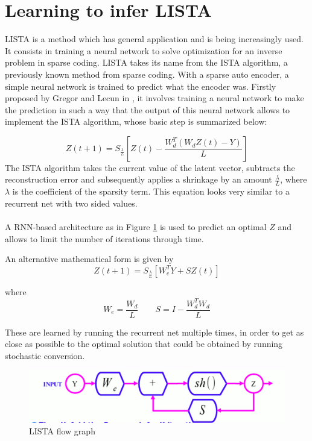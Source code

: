 \documentclass[12pt,letterpaper]{article}
\begin{document}
\section*{Learning to infer LISTA}

LISTA is a method which has general application and is being increasingly used. It consists in training a neural network to solve optimization for an inverse problem in sparse coding. 
LISTA takes its name from the ISTA algorithm, a previously known method from sparse coding.
With a sparse auto encoder, a simple neural network is trained to predict what the encoder was. Firstly proposed by Gregor and Lecun in \cite{gregor2010learning}, it involves training a neural network to make the prediction in such a way that the output of this neural network allows to implement the ISTA algorithm, whose basic step is summarized below:

\[
Z(t+1) = S_{\frac{\lambda}{L}}[Z(t) - \frac{W_d ^ T (W_d Z(t) - Y)}{L}] 
\]
The ISTA algorithm takes the current value of the latent vector, subtracts the reconstruction error and subsequently applies a shrinkage by an amount $\frac{\lambda}{L}$, where $\lambda$ is the coefficient of the sparsity term. This equation looks very similar to a recurrent net with two sided values.\\
\\
A RNN-based architecture as in Figure \ref{fig:fistaFlowGraph} is used to predict an optimal $Z$ and allows to limit the number of iterations through time.

An alternative mathematical form is given by
\[Z(t+1) = S_{\frac{\lambda}{L}}[W_e ^T Y + SZ(t)]\]

where
\[W_e = \frac{W_d}{L} \quad\quad S = I - \frac{ W_d ^T W_d}{L}\]

These are learned by running the recurrent net multiple times, in order to get as close as possible to the optimal solution that could be obtained by running stochastic conversion.\\


\begin{figure}[H]
  \includegraphics[width=\linewidth]{FISTAFlowGraph.jpg}
  \caption{LISTA flow graph}
  \label{fig:fistaFlowGraph}
\end{figure}
\end{document}
